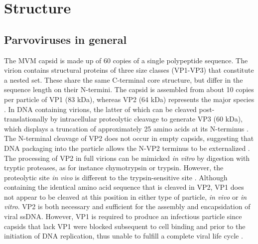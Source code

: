 

\section{Structure}

\subsection{Parvoviruses in general}


The MVM capsid is made up of 60 copies of a single polypeptide sequence. The virion contains structural proteins of three size classes (VP1-VP3) that constitute a nested set. These share the same C-terminal core structure, but differ in the sequence length on their N-termini. The capsid is assembled from about 10 copies per particle of VP1 (83 kDa), whereas VP2 (64 kDa) represents the major species \cite{pmid988192}. In DNA containing virions, the latter of which can be cleaved post-translationally by intracellular proteolytic cleavage to generate VP3 (60 kDa), which displays a truncation of approximately 25 amino acids at its N-terminus \cite{pmid864702, pmid1448928, pmid982825, pmid9770425}. The N-terminal cleavage of VP2 does not occur in empty capsids, suggesting that DNA packaging into the particle allows the N-VP2 terminus to be externalized \cite{pmid3296697, pmid6481856, pmid864702}. The processing of VP2 in full virions can be mimicked \textit{in vitro} by digestion with tryptic proteases, as for instance chymotrypsin or trypsin. However, the proteolytic site \textit{in vivo} is different to the trypsin-sensitive site \cite{pmid6481856, pmid864702, pmid1448928}. Although containing the identical amino acid sequence that is cleaved in VP2, VP1 does not appear to be cleaved at this position in either type of particle, \textit{in vivo} or \textit{in vitro}. VP2 is both necessary and sufficient for the assembly and encapsidation of viral ssDNA. However, VP1 is required to produce an infectious particle since capsids that lack VP1 were blocked subsequent to cell binding and prior to the initiation of DNA replication, thus unable to fulfill a complete viral life cycle \cite{pmid8416366}.
    
